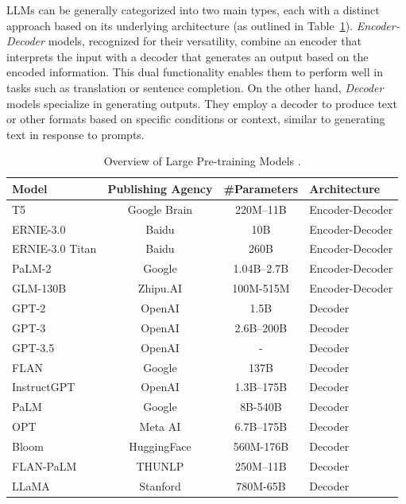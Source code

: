 {{LLMs can be generally categorized into two main types, each with a distinct approach based on its underlying architecture \parencite{yuhan-etal-2023-unleashing} (as outlined in Table~\ref{tab:pre-trained-models}). \emph{Encoder-Decoder} models, recognized for their versatility, combine an encoder that interprets the input with a decoder that generates an output based on the encoded information. This dual functionality enables them to perform well in tasks such as translation or sentence completion. On the other hand, \emph{Decoder} models specialize in generating outputs. They employ a decoder to produce text or other formats based on specific conditions or context, similar to generating text in response to prompts.

\begin{table}[htb]
\footnotesize
\centering
\begin{tabular}{lccl}
\toprule
\textbf{Model} & \textbf{Publishing Agency} & \textbf{\#Parameters} & \textbf{Architecture} \\ \midrule
T5 \parencite{JMLR:v21:20-074} & Google Brain  & 220M--11B & Encoder-Decoder \\
ERNIE-3.0 \parencite{sun-at-al-2021}  & Baidu & 10B & Encoder-Decoder \\
ERNIE-3.0 Titan \parencite{wang-at-al-2021}   & Baidu  & 260B & Encoder-Decoder \\
PaLM-2 \parencite{google_palm2_2023}  & Google & 1.04B--2.7B & Encoder-Decoder \\
GLM-130B \parencite{zeng2023glm130b}  & Zhipu.AI  & 100M-515M & Encoder-Decoder \\ 
\midrule
GPT-2 \parencite{brown-at-al-2020}  & OpenAI  & 1.5B & Decoder \\
GPT-3 \parencite{ye2023comprehensive} & OpenAI  & 2.6B--200B & Decoder \\
GPT-3.5 \parencite{lin2023comparison}  & OpenAI  & - & Decoder \\
\midrule
FLAN \parencite{wei2022finetuned}  & Google & 137B & Decoder \\
InstructGPT \parencite{ouyang2022training}  & OpenAI & 1.3B--175B & Decoder \\
PaLM \parencite{chowdhery2022palm}  & Google & 8B-540B & Decoder \\
OPT \parencite{zhang2022opt}  & Meta AI  & 6.7B--175B & Decoder \\
Bloom \parencite{workshop2023bloom}  & HuggingFace  & 560M-176B & Decoder \\
FLAN-PaLM \parencite{chung2022scaling}  & THUNLP  & 250M--11B & Decoder \\
LLaMA \parencite{touvron2023llama}  & Stanford  & 780M-65B & Decoder \\
\bottomrule
\end{tabular}
\caption{Overview of Large Pre-training Models \parencite{yuhan-etal-2023-unleashing}.}
\label{tab:pre-trained-models}
\end{table}

}}
